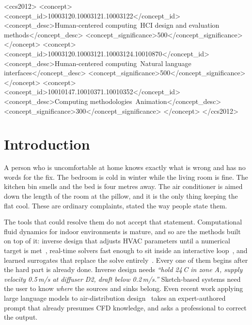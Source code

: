 \documentclass[manuscript,review,anonymous]{acmart}
\begin{document}
\begin{CCSXML}
<ccs2012>
<concept>
<concept_id>10003120.10003121.10003122</concept_id>
<concept_desc>Human-centered computing~HCI design and evaluation methods</concept_desc>
<concept_significance>500</concept_significance>
</concept>
<concept>
<concept_id>10003120.10003121.10003124.10010870</concept_id>
<concept_desc>Human-centered computing~Natural language interfaces</concept_desc>
<concept_significance>500</concept_significance>
</concept>
<concept>
<concept_id>10010147.10010371.10010352</concept_id>
<concept_desc>Computing methodologies~Animation</concept_desc>
<concept_significance>300</concept_significance>
</concept>
</ccs2012>
\end{CCSXML}



\maketitle

\section{Introduction}

A person who is uncomfortable at home knows exactly what is wrong and has no
words for the fix. The bedroom is cold in winter while the living room is fine.
The kitchen bin smells and the bed is four metres away. The air conditioner is
aimed down the length of the room at the pillow, and it is the only thing
keeping the flat cool. These are ordinary complaints, stated the way people
state them.

The tools that could resolve them do not accept that statement. Computational
fluid dynamics for indoor environments is mature, and so are the methods built
on top of it: inverse design that adjusts HVAC parameters until a numerical
target is met~\cite{liu2017inverse}, real-time solvers fast enough to sit inside
an interactive loop~\cite{zhu2011sketchfluid}, and learned surrogates that
replace the solve
entirely~\cite{thuerey2020deep}. Every one of them begins after the hard part is
already done. Inverse design needs \emph{``hold 24\,\textdegree C in zone A,
supply velocity 0.5\,m/s at diffuser D2, draft below 0.2\,m/s.''} Sketch-based
systems need the user to know \emph{where} the sources and sinks belong. Even
recent work applying large language models to air-distribution
design~\cite{dai2025llm} takes an expert-authored prompt that already presumes
CFD knowledge, and asks a professional to correct the output.
\end{document}
